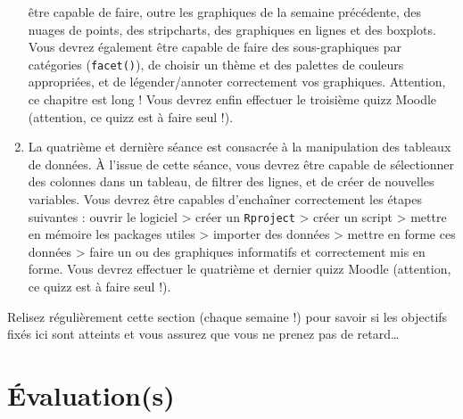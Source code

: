 \documentclass[
  a4paper,
  DIV=11,
  numbers=noendperiod,
  oneside]{scrreprt}
\begin{document}
\begin{enumerate}
  être capable de faire, outre les graphiques de la semaine précédente,
  des nuages de points, des stripcharts, des graphiques en lignes et des
  boxplots. Vous devrez également être capable de faire des
  sous-graphiques par catégories (\texttt{facet()}), de choisir un thème
  et des palettes de couleurs appropriées, et de légender/annoter
  correctement vos graphiques. Attention, ce chapitre est long ! Vous
  devrez enfin effectuer le troisième quizz Moodle (attention, ce quizz
  est à faire seul !).
\item
  La quatrième et dernière séance est consacrée à la manipulation des
  tableaux de données. À l'issue de cette séance, vous devrez être
  capable de sélectionner des colonnes dans un tableau, de filtrer des
  lignes, et de créer de nouvelles variables. Vous devrez être capables
  d'enchaîner correctement les étapes suivantes : ouvrir le logiciel
  \textgreater{} créer un \texttt{Rproject} \textgreater{} créer un
  script \textgreater{} mettre en mémoire les packages utiles
  \textgreater{} importer des données \textgreater{} mettre en forme ces
  données \textgreater{} faire un ou des graphiques informatifs et
  correctement mis en forme. Vous devrez effectuer le quatrième et
  dernier quizz Moodle (attention, ce quizz est à faire seul !).
\end{enumerate}

\begin{tcolorbox}[enhanced jigsaw, arc=.35mm, opacityback=0, colbacktitle=quarto-callout-warning-color!10!white, bottomrule=.15mm, coltitle=black, colframe=quarto-callout-warning-color-frame, breakable, toprule=.15mm, title=\textcolor{quarto-callout-warning-color}{\faExclamationTriangle}\hspace{0.5em}{Attention au retard}, leftrule=.75mm, titlerule=0mm, bottomtitle=1mm, toptitle=1mm, left=2mm, rightrule=.15mm, opacitybacktitle=0.6, colback=white]

Relisez régulièrement cette section (chaque semaine !) pour savoir si
les objectifs fixés ici sont atteints et vous assurez que vous ne prenez
pas de retard\ldots{}

\end{tcolorbox}

\section*{Évaluation(s)}\label{uxe9valuations}

\end{document}
